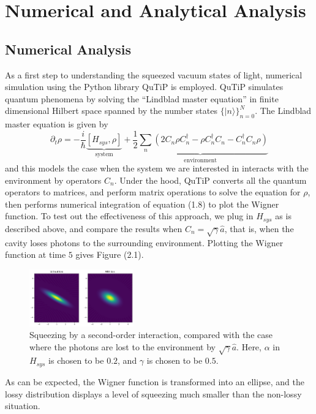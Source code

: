 \documentclass[10pt,a4paper]{report}
\newcommand*\ket[1]{|{#1}\rangle}
\begin{document}
\chapter{Numerical and Analytical Analysis}\label{chap:main}
\section{Numerical Analysis}
As a first step to understanding the squeezed vacuum states of light, numerical simulation using the Python library QuTiP is employed\cite{qutip}.
QuTiP simulates quantum phenomena by solving the ``Lindblad master equation'' in finite dimensional Hilbert space spanned by the number states $\{\ket{n}\}_{n=0}^{N}$.
The Lindblad master equation is given by
\begin{equation}
  \partial_{t}\rho=-\frac{i}{\hbar}\underbrace{[H_{sys},\rho]}_{\text{system}}+\underbrace{\frac{1}{2}\sum_{n}(2C_{n}\rho C_{n}^{\dag}-\rho C_{n}^{\dag}C_{n}-C_{n}^{\dag} C_{n}\rho)}_{\text{environment}}
\end{equation}
and this models the case when the system we are interested in interacts with the environment by operators $C_{n}$.
Under the hood, QuTiP converts all the quantum operators to matrices, and perform matrix operations to solve the equation for $\rho$, then performs numerical integration of equation (1.8) to plot the Wigner function.
To test out the effectiveness of this approach, we plug in $H_{sys}$ as is described above, and compare the results when $C_{n}=\sqrt{\gamma}\hat{a}$, that is, when the cavity loses photons to the surrounding environment.
Plotting the Wigner function at time $5$ gives Figure (2.1).
\begin{figure}[htb]
  \centering
  \includegraphics[width=0.4\textwidth]{squeezed_decay_0.5.png}
  \caption{Squeezing by a second-order interaction, compared with the case where the photons are lost to the environment by $\sqrt{\gamma}\hat{a}$. Here, $\alpha$ in $H_{sys}$ is chosen to be $0.2$, and $\gamma$ is chosen to be $0.5$.}
\end{figure}
As can be expected, the Wigner function is transformed into an ellipse, and the lossy distribution displays a level of squeezing much smaller than the non-lossy situation.
\end{document}
